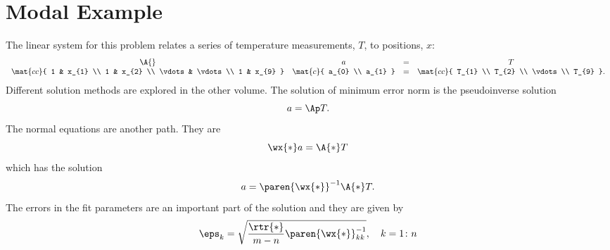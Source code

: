 \chapter{Modal Example}  %
The linear system for this problem relates a series of temperature measurements, $T$, to positions, $x$:
  \begin{equation*}   %
    \begin{array}{cccc}
     \A{} & a & = & T \\
     \mat{cc}{ 1 & x_{1} \\ 1 & x_{2} \\ \vdots & \vdots \\ 1 & x_{9} } &
     \mat{c}{ a_{0} \\ a_{1} } & = &
     \mat{cc}{ T_{1} \\ T_{2} \\ \vdots \\ T_{9} } .
    \end{array}
  \end{equation*}
Different solution methods are explored in the other volume. The solution of minimum error norm is the pseudoinverse solution
  \begin{equation*}   %
    a = \Ap T .
    \label{eq:bev ap}
  \end{equation*}
The normal equations are another path. They are
  \begin{equation*}   %
    \wx{*} a = \A{*} T
  \end{equation*}
which has the solution
  \begin{equation}   %
    a = \paren{\wx{*}}^{-1} \A{*}T .
    \label{eq:bev normal}
  \end{equation}
The errors in the fit parameters are an important part of the solution and they are given by
  \begin{equation*}   %
    \eps_{k} = \sqrt{ \frac{\rtr{*}} {m - n} \paren{\wx{*}}^{-1}_{kk} }, \quad k = 1\colon n
  \end{equation*}  
  
